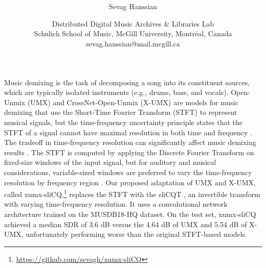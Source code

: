 \documentclass[letter,12pt]{article}
\title{\vspace{-2.25em}\textbf{\ThesisTitle}\vspace{-0.75em}}
\author{Sevag Hanssian}
\date{
\vspace{-0.75em}
\small{
Distributed Digital Music Archives \& Libraries Lab\\
Schulich School of Music, McGill University, Montr{\'e}al, Canada\\
}
\footnotesize{sevag.hanssian@mail.mcgill.ca}
\vspace{-1.25em}
}
\begin{document}
\maketitle
\thispagestyle{empty}

Music demixing is the task of decomposing a song into its constituent sources, which are typically isolated instruments (e.g., drums, bass, and vocals). Open-Unmix (UMX) \parencite{umx} and CrossNet-Open-Unmix (X-UMX) \parencite{xumx} are models for music demixing that use the Short-Time Fourier Transform (STFT) to represent musical signals, but the time-frequency uncertainty principle states that the STFT of a signal cannot have maximal resolution in both time and frequency \parencite{gabor1946}. The tradeoff in time-frequency resolution can significantly affect music demixing results \parencite{tftradeoff1}. The STFT is computed by applying the Discrete Fourier Transform on fixed-size windows of the input signal, but for auditory and musical considerations, variable-sized windows are preferred to vary the time-frequency resolution by frequency region \parencite{doerflerphd}. Our proposed adaptation of UMX and X-UMX, called xumx-sliCQ,\footnote{\url{https://github.com/sevagh/xumx-sliCQ}} replaces the STFT with the sliCQT \parencite{slicq}, an invertible transform with varying time-frequency resolution. It uses a convolutional network architecture \parencite{plumbley2} trained on the MUSDB18-HQ \parencite{musdb18hq} dataset. On the test set, xumx-sliCQ achieved a median SDR of 3.6 dB versus the 4.64 dB of UMX and 5.54 dB of X-UMX, unfortunately performing worse than the original STFT-based models.

\begingroup
{}
\setlength\bibitemsep{0.015em}
\printbibliography
\endgroup
\end{document}
